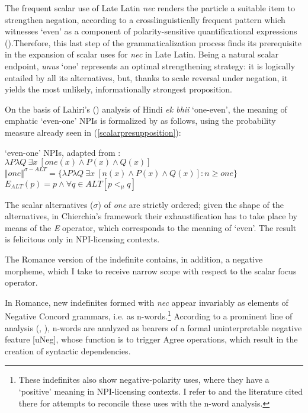 \documentclass[output=paper,modfonts,nonflat,citecolor=brown,
showindex
]{langsci/langscibook}
\begin{document}
The frequent scalar use of Late Latin {\em{nec}} renders the particle a suitable item to strengthen negation, according to a crosslinguistically frequent pattern which witnesses `even' as a component of polarity-sensitive quantificational expressions (\citealt[]{Haspelmath97, Lahiri98, Watanabe04, Chierchia13}).Therefore, this last step of the grammaticalization process finds its prerequisite in the expansion of scalar uses for {\em{nec}} in Late Latin. Being a natural scalar endpoint, {\em{unus}} `one' represents an optimal strengthening strategy: it is logically entailed by all its alternatives, but, thanks to scale reversal under negation, it yields the most unlikely, informationally strongest proposition. 

On the basis of Lahiri's (\citeyear{Lahiri98}) analysis of Hindi {\em{ek bhii}} `one-even', the meaning of emphatic `even-one' NPIs is formalized by \citet[156]{Chierchia13} as follows, using the probability measure already seen in (\ref{scalarpresupposition}):

{\begin{exe}
\ex
\begin{xlist}
\ex \label{evenoneNPIChierchia} `even-one' NPIs, adapted from \citet[156]{Chierchia13}:\\ 
$\lambda P \lambda Q \ \exists x \ [one(x) \wedge P(x) \wedge Q(x) ]$\\
$\Vert one \Vert^{\sigma-ALT} = \{ \lambda P \lambda Q \ \exists x \ [n(x) \wedge P(x) \wedge Q(x)]: n \geq one \}$
\ex $ E_{ALT}(p) = p \wedge \forall q \in ALT [p <_{\mu} q]$
\end{xlist}
\end{exe}}

\noindent The scalar alternatives ($\sigma$) of {\em{one}} are strictly ordered; given the shape of the alternatives, in Chierchia's framework their exhaustification has to take place by means of the {\em{E}} operator, which corresponds to the meaning of `even'. The result is felicitous only in NPI-licensing contexts.

The Romance version of the indefinite contains, in addition, a negative morpheme, which I take to receive narrow scope with respect to the scalar focus operator.

In Romance, new indefinites formed with {\em{nec}} appear invariably as elements of Negative Concord grammars, i.e. as n-words.{\footnote{These indefinites also show negative-polarity uses, where they have a `positive' meaning in NPI-licensing contexts. I refer to \citet[chapter 5]{Gianollo18} and the literature cited there for attempts to reconcile these uses with the n-word analysis.}} 
According to a prominent line of analysis (\citealt[]{Zeijlstra04, Zeijlstra14}, \citealt[]{Penka11}), n-words are analyzed as bearers of a formal uninterpretable negative feature [uNeg], whose function is to trigger Agree operations, which result in the creation of syntactic dependencies. 
\end{document}
